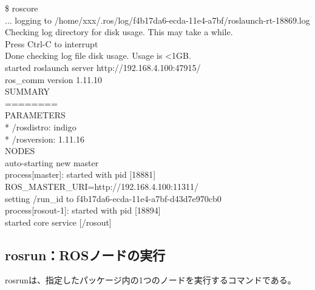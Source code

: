 \setcounter{num}{0}

\begin{textbox}
\$ roscore\\
\noindent ... logging to /home/xxx/.ros/log/f4b17da6-ecda-11e4-a7bf/roslaunch-rt-18869.log \circled{\thenum}\\
\noindent Checking log directory for disk usage. This may take a while.\\
\noindent Press Ctrl-C to interrupt  \circled{\thenum}\\
\noindent Done checking log file disk usage. Usage is <1GB.\\

\noindent started roslaunch server http://192.168.4.100:47915/\\
ros\_comm version 1.11.10\\

\noindent SUMMARY\\
========\\

\noindent PARAMETERS\\
 * /rosdistro: indigo \circled{\thenum}\\
 * /rosversion: 1.11.16 \circled{\thenum}\\

\noindent NODES\\

\noindent auto-starting new master\\
process[master]: started with pid [18881]\\
ROS\_MASTER\_URI=http://192.168.4.100:11311/ \circled{\thenum}\\

\noindent setting /run\_id to f4b17da6-ecda-11e4-a7bf-d43d7e970cb0\\
process[rosout-1]: started with pid [18894]\\
started core service [/rosout] \circled{\thenum}\\
\end{textbox}



\subsection{rosrun：ROSノードの実行}

rosrunは、指定したパッケージ内の1つのノードを実行するコマンドである。\\

